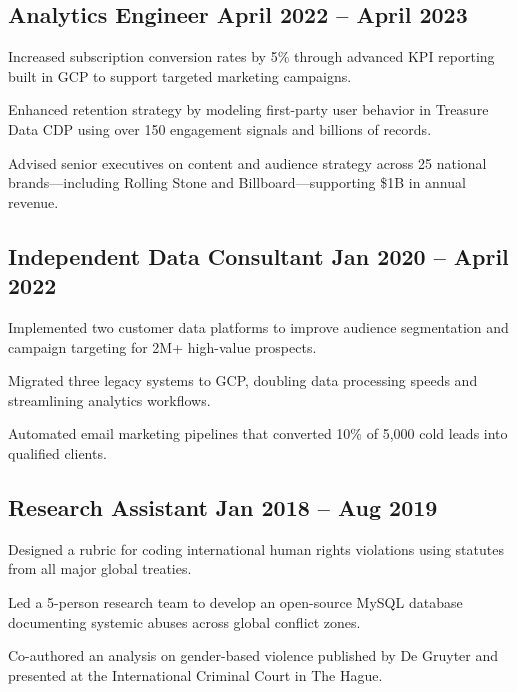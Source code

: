 \documentclass[singlesided, paper=a4, fontsize=10pt]{testing-class}
\begin{document}
{    \subsection{Analytics Engineer \hfill April 2022 -- April 2023}
    \begin{zitemize}
        \item Increased subscription conversion rates by 5\% through advanced KPI reporting built in GCP to support targeted marketing campaigns.
        \item Enhanced retention strategy by modeling first-party user behavior in Treasure Data CDP using over 150 engagement signals and billions of records.
        \item Advised senior executives on content and audience strategy across 25 national brands—including Rolling Stone and Billboard—supporting \$1B in annual revenue.
    \end{zitemize}


    \subsection{Independent Data Consultant \hfill Jan 2020 -- April 2022}
    \begin{zitemize}
        \item Implemented two customer data platforms to improve audience segmentation and campaign targeting for 2M+ high-value prospects.
        \item Migrated three legacy systems to GCP, doubling data processing speeds and streamlining analytics workflows.
        \item Automated email marketing pipelines that converted 10\% of 5,000 cold leads into qualified clients.
    \end{zitemize}


    \subsection{Research Assistant \hfill Jan 2018 -- Aug 2019}
    \begin{zitemize}
        \item Designed a rubric for coding international human rights violations using statutes from all major global treaties.
        \item Led a 5-person research team to develop an open-source MySQL database documenting systemic abuses across global conflict zones.
        \item Co-authored an analysis on gender-based violence published by De Gruyter and presented at the International Criminal Court in The Hague.
    \end{zitemize}


}
\end{document}
